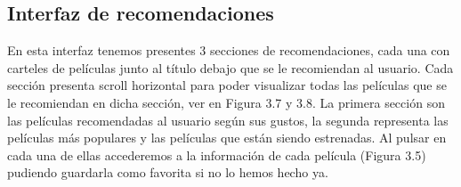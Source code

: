 \subsection{Interfaz de recomendaciones}
\label{makereference3.4.6}
En esta interfaz tenemos presentes 3 secciones de recomendaciones, cada una con carteles de películas junto al título debajo que se le recomiendan al usuario. Cada sección presenta scroll horizontal para poder
visualizar todas las películas que se le recomiendan en dicha sección, ver en Figura 3.7 y 3.8. La primera sección son las películas recomendadas al usuario según sus gustos, la segunda representa las películas más populares
y las películas que están siendo estrenadas. Al pulsar en cada una de ellas accederemos a la información de cada película (Figura 3.5) pudiendo guardarla como favorita si no lo hemos hecho ya.
\begin{figure}[H]
    \centering
\end{figure}

